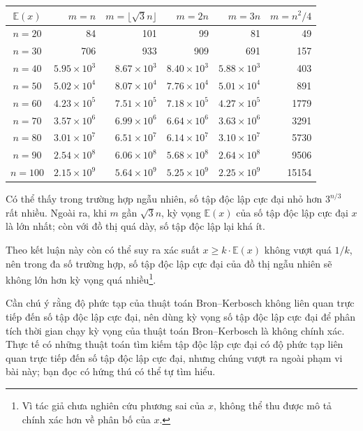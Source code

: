 \documentclass[11pt]{article}
\begin{document}
\begin{center}
\small
\begin{tabular}{c r r r r r}
\(\mathbb{E}(x)\) & \(m=n\) & \(m=\lfloor\sqrt3 n\rfloor\) & \(m=2n\) &
\(m=3n\) & \(m=n^2/4\)\\
\hline
\(n=20\) & 84 & 101 & 99 & 81 & 49\\
\(n=30\) & 706 & 933 & 909 & 691 & 157\\
\(n=40\) & \(5.95\times10^3\) & \(8.67\times10^3\) &
  \(8.40\times10^3\) & \(5.88\times10^3\) & 403\\
\(n=50\) & \(5.02\times10^4\) & \(8.07\times10^4\) &
  \(7.76\times10^4\) & \(5.01\times10^4\) & 891\\
\(n=60\) & \(4.23\times10^5\) & \(7.51\times10^5\) &
  \(7.18\times10^5\) & \(4.27\times10^5\) & 1779\\
\(n=70\) & \(3.57\times10^6\) & \(6.99\times10^6\) &
  \(6.64\times10^6\) & \(3.63\times10^6\) & 3291\\
\(n=80\) & \(3.01\times10^7\) & \(6.51\times10^7\) &
  \(6.14\times10^7\) & \(3.10\times10^7\) & 5730\\
\(n=90\) & \(2.54\times10^8\) & \(6.06\times10^8\) &
  \(5.68\times10^8\) & \(2.64\times10^8\) & 9506\\
\(n=100\) & \(2.15\times10^9\) & \(5.64\times10^9\) &
  \(5.25\times10^9\) & \(2.25\times10^9\) & 15154
\end{tabular}
\end{center}

Có thể thấy trong trường hợp ngẫu nhiên, số tập độc lập cực đại nhỏ hơn
\(3^{n/3}\) rất nhiều. Ngoài ra, khi \(m\) gần \(\sqrt3 n\), kỳ vọng
\(\mathbb{E}(x)\) của số tập độc lập cực đại \(x\) là lớn nhất; còn với đồ thị
quá dày, số tập độc lập lại khá ít.

Theo kết luận này còn có thể suy ra xác suất \(x\ge k\cdot\mathbb{E}(x)\)
không vượt quá \(1/k\), nên trong đa số trường hợp, số tập độc lập cực đại của
đồ thị ngẫu nhiên sẽ không lớn hơn kỳ vọng quá nhiều\footnote{Vì tác giả chưa
nghiên cứu phương sai của \(x\), không thể thu được mô tả chính xác hơn về
phân bố của \(x\).}.

Cần chú ý rằng độ phức tạp của thuật toán Bron--Kerbosch không liên quan trực
tiếp đến số tập độc lập cực đại, nên dùng kỳ vọng số tập độc lập cực đại để
phân tích thời gian chạy kỳ vọng của thuật toán Bron--Kerbosch là không chính
xác. Thực tế có những thuật toán tìm kiếm tập độc lập cực đại có độ phức tạp
liên quan trực tiếp đến số tập độc lập cực đại, nhưng chúng vượt ra ngoài phạm
vi bài này; bạn đọc có hứng thú có thể tự tìm hiểu.
\end{document}
